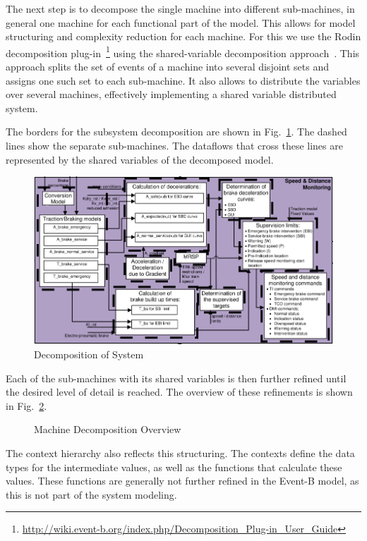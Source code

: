 \documentclass{template/openetcs_article}
\begin{document}
The next step is to decompose the single machine into different sub-machines, in
general one machine for each functional part of the model. This allows for model
structuring and complexity reduction for each machine. For this we use the Rodin
decomposition
plug-in~\footnote{\url{http://wiki.event-b.org/index.php/Decomposition_Plug-in_User_Guide}}
using the shared-variable decomposition
approach~\cite{silva2011decomposition}. This approach splits the set of events
of a machine into several disjoint sets and assigns one such set to each
sub-machine. It also allows to distribute the variables over several machines,
effectively implementing a shared variable distributed system.

The borders for the subsystem decomposition are shown in
Fig.~\ref{fig:system-decomposition}. The dashed lines show the separate
sub-machines. The dataflows that cross these lines are represented by the shared
variables of the decomposed model.

\begin{figure}[ht]
  \centering
  \includegraphics[width=.66\textwidth]{OverviewSelected}
  \caption{Decomposition of System}
  \label{fig:system-decomposition}
\end{figure}

Each of the sub-machines with its shared variables is then further refined until
the desired level of detail is reached. The overview of these refinements is
shown in Fig.~\ref{fig:machine-decompositon-overview}.

\begin{figure}[ht]
  \centering
  \vspace{5cm}
  \caption{Machine Decomposition Overview}
  \label{fig:machine-decompositon-overview}
\end{figure}

The context hierarchy also reflects this structuring. The contexts define the
data types for the intermediate values, as well as the functions that calculate
these values. These functions are generally not further refined in the Event-B
model, as this is not part of the system modeling.
\end{document}
